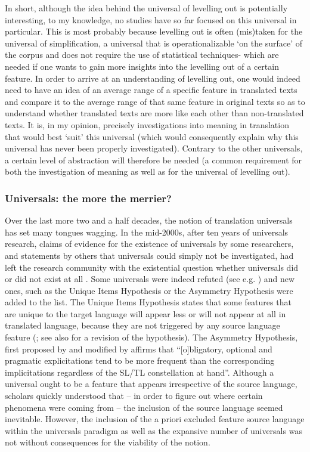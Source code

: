 In short, although the idea behind the universal of levelling out is potentially interesting, to my knowledge, no studies have so far focused on this universal in particular. This is most probably because levelling out is often (mis)taken for the universal of simplification, a universal that is operationalizable ‘on the surface’ of the corpus and does not require the use of statistical techniques- which are needed if one wants to gain more insights into the levelling out of a certain feature. In order to arrive at an understanding of levelling out, one would indeed need to have an idea of an average range of a specific feature in translated texts and compare it to the average range of that same feature in original texts so as to understand whether translated texts are more like each other than non-translated texts. It is, in my opinion, precisely investigations into meaning in translation that would best ‘suit’ this universal (which would consequently explain why this universal has never been properly investigated). Contrary to the other universals, a certain level of abstraction will therefore be needed (a common requirement for both the investigation of meaning as well as for the universal of levelling out).

\subsubsection{Universals: the more the merrier?}
\label{sec:2.2.2.5}  
Over the last more two and a half decades, the notion of translation universals has set many tongues wagging. In the mid-2000s, after ten years of universals research, claims of evidence for the existence of universals by some researchers, and statements by others that universals could simply not be investigated, had left the research community with the existential question whether universals did or did not exist at all  \citep[1]{Mauranen2004}. Some universals were indeed refuted (see e.g. \citealt{becher_abandoning_2010}) and new ones, such as the Unique Items Hypothesis  \citep{mauranen_unique_2004} or the Asymmetry Hypothesis \citep{dimitriu_asymmetry_2009} were added to the list. The Unique Items Hypothesis states that some features that are unique to the target language will appear less or will not appear at all in translated language, because they are not triggered by any source language feature  (\citealt{mauranen_unique_2004}; see also \citealt{gambier_what_2004} for a revision of the hypothesis). The Asymmetry Hypothesis, first proposed by \citet{dimitriu_asymmetry_2009} and modified by \citet{becher_abandoning_2010} affirms that “[o]bligatory, optional and pragmatic explicitations tend to be more frequent than the corresponding implicitations regardless of the SL/TL constellation at hand”. Although a universal ought to be a feature that appears irrespective of the source language, scholars quickly understood that – in order to figure out where certain phenomena were coming from – the inclusion of the source language seemed inevitable. However, the inclusion of the a priori excluded feature source language within the universals paradigm as well as the expansive number of universals was not without consequences for the viability of the notion. 

